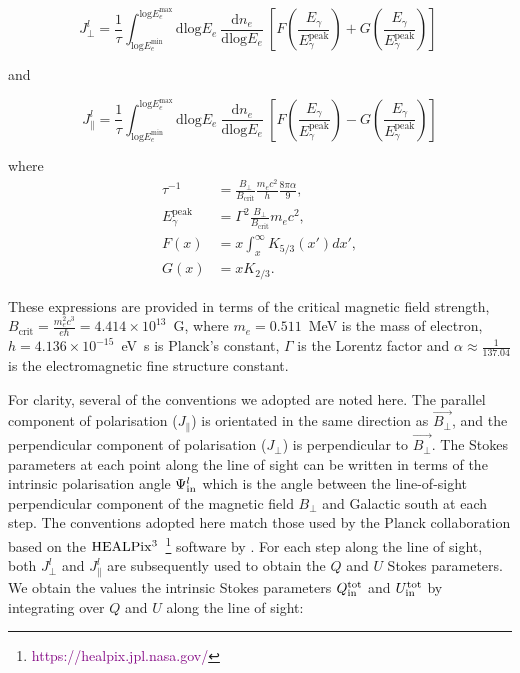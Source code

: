 \documentclass[usenatbib]{mnras}
\begin{document}
\begin{equation}
 {J_{\perp}^l} = \frac{1}{\tau}  \int_{\mathrm{log}E_e^{\mathrm{min}}}^{\mathrm{log}E_e^{\mathrm{max}}}\mathrm{dlog}E_{e} \  \frac{\mathrm{d}n_e}{\mathrm{dlog}E_{e}} \  \left[F\left(\frac{E_{\gamma}}{E_{\gamma}^{\mathrm{peak}}}\right) + G\left(\frac{E_{\gamma}}{E_{\gamma}^{\mathrm{peak}}}\right)\right] \
 \label{Jperp}
\end{equation}


and

\begin{equation}
{J_{\parallel}^l} = \frac{1}{\tau} \int_{\mathrm{log}E_e^{\mathrm{min}}}^{\mathrm{log}E_e^{\mathrm{max}}}\mathrm{dlog}E_{e} \ \frac{\mathrm{d}n_e}{\mathrm{dlog}E_{e}} \  \left[F\left(\frac{E_{\gamma}}{E_{\gamma}^{\mathrm{peak}}}\right) - G\left(\frac{E_{\gamma}}{E_{\gamma}^{\mathrm{peak}}}\right)\right] 
\label{Jpara}
\end{equation}

where
\begin{align}
\tau^{-1} &= \frac{B_{\perp}}{B_{\mathrm{crit}}}\frac{m_{e}c^{2}}{h} \frac{8\pi \alpha}{9},
\\
E_{\gamma}^{\mathrm{peak}} &= \Gamma^2 \frac{B_{\perp}}{B_{\mathrm{crit}}} m_{e} c^2,\\
F(x) &= x \int_x^\infty K_{5/3}(x') dx',\\
G(x) &= x K_{2/3}.
\end{align}

These expressions are provided in terms of the critical magnetic field strength, $B_{\mathrm{crit}} = \frac{m_e^2c^3}{e\hbar} = 4.414 \times 10^{13}$~G, where $m_e = 0.511$~MeV is the mass of electron, $h = 4.136 \times 10^{-15}$~eV~s is Planck's constant, $\Gamma$ is the Lorentz factor and $\alpha \approx \frac{1}{137.04}$ is the electromagnetic fine structure constant.


For clarity, several of the conventions we adopted are noted here. The parallel component of polarisation (${J_{\parallel}}$) is orientated in the same direction as  $\vec{B_{\perp}}$, and the perpendicular component of polarisation (${J_{\perp}}$) is perpendicular to $\vec{B_{\perp}}$. The Stokes parameters at each point along the line of sight can be written in terms of the intrinsic polarisation angle $\Psi^l_{\rm in}$ which is the angle between the line-of-sight perpendicular component of the magnetic field $B_{\perp}$ and Galactic south at each step. The conventions adopted here match those used by the Planck collaboration \citep{Planck_XIX} based on the $\rm HEALPix^3$~\footnote{\textcolor{purple}{https://healpix.jpl.nasa.gov/}} software by \cite{Healpix_2005}. For each step along the line of sight, both  ${J_{\perp}^l}$ and ${J_{\parallel}^l}$ are subsequently used to obtain the $Q$ and $U$ Stokes parameters. We obtain the values the intrinsic Stokes parameters $Q^{\rm tot}_{\rm in}$ and $U^{\rm tot}_{\rm in}$ by integrating over $Q$ and $U$ along the line of sight:
\end{document}
